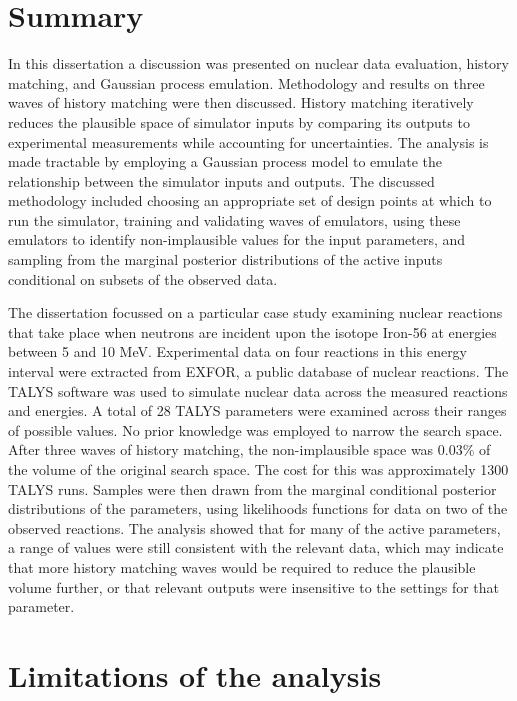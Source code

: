 \documentclass[
  12pt,
  a4paper,
  twoside]{book}
\begin{document}
\hypertarget{summary}{%
\section{Summary}\label{summary}}

In this dissertation a discussion was presented on nuclear data evaluation, history matching, and Gaussian process emulation. Methodology and results on three waves of history matching were then discussed. History matching iteratively reduces the plausible space of simulator inputs by comparing its outputs to experimental measurements while accounting for uncertainties. The analysis is made tractable by employing a Gaussian process model to emulate the relationship between the simulator inputs and outputs. The discussed methodology included choosing an appropriate set of design points at which to run the simulator, training and validating waves of emulators, using these emulators to identify non-implausible values for the input parameters, and sampling from the marginal posterior distributions of the active inputs conditional on subsets of the observed data.

The dissertation focussed on a particular case study examining nuclear reactions that take place when neutrons are incident upon the isotope Iron-56 at energies between 5 and 10 MeV. Experimental data on four reactions in this energy interval were extracted from EXFOR, a public database of nuclear reactions. The TALYS software was used to simulate nuclear data across the measured reactions and energies. A total of 28 TALYS parameters were examined across their ranges of possible values. No prior knowledge was employed to narrow the search space. After three waves of history matching, the non-implausible space was 0.03\% of the volume of the original search space. The cost for this was approximately 1300 TALYS runs. Samples were then drawn from the marginal conditional posterior distributions of the parameters, using likelihoods functions for data on two of the observed reactions. The analysis showed that for many of the active parameters, a range of values were still consistent with the relevant data, which may indicate that more history matching waves would be required to reduce the plausible volume further, or that relevant outputs were insensitive to the settings for that parameter.

\hypertarget{limits}{%
\section{Limitations of the analysis}\label{limits}}
\end{document}
